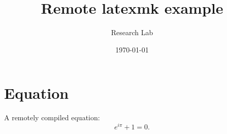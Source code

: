\documentclass{article}
\title{Remote latexmk example}
\author{Research Lab}
\date{\today}
\begin{document}
\maketitle
\section{Equation}
A remotely compiled equation:
\[
  e^{i\pi}+1=0.
\]
\end{document}
